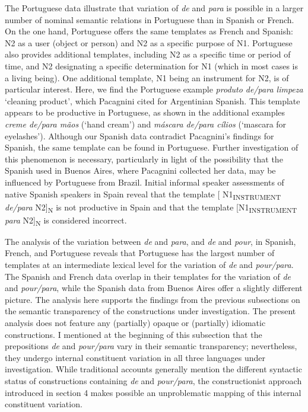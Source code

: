 \documentclass[output=paper]{langsci/langscibook}
\begin{document}
The Portuguese data illustrate that variation of \textit{de} and \textit{para} is possible in a larger number of nominal semantic relations in Portuguese than in Spanish or French. On the one hand, Portuguese offers the same templates as French and Spanish: N2 as a user (object or person) and N2 as a specific purpose of N1. Portuguese also provides additional templates, including N2 as a specific time or period of time, and N2 designating a specific determination for N1 (which in most cases is a living being). One additional template, N1 being an instrument for N2, is of particular interest. Here, we find the Portuguese example \textit{produto de/para limpeza} `cleaning product', which Pacagnini cited for Argentinian Spanish. This template appears to be productive in Portuguese, as shown in the additional examples \textit{creme de/para mãos} (`hand cream') and \textit{máscara de\slash para cílios} (`mascara for eyelashes'). Although our Spanish data contradict Pacagnini's findings for Spanish, the same template can be found in Portuguese. Further investigation of this phenomenon is necessary, particularly in light of the possibility that the Spanish used in Buenos Aires, where Pacagnini collected her data, may be influenced by Portuguese from Brazil. Initial informal speaker assessments of native Spanish speakers in Spain reveal that the template [ N1\textsubscript{INSTRUMENT} \textit{de/para} N2]\textsubscript{N} is not productive in Spain and that the template [N1\textsubscript{INSTRUMENT} \textit{para} N2]\textsubscript{N} is considered incorrect. 

The analysis of the variation between \textit{de} and \textit{para}, and \textit{de} and \textit{pour}, in Spanish, French, and Portuguese reveals that Portuguese has the largest number of templates at an intermediate lexical level for the variation of \textit{de} and \textit{pour/para}. The Spanish and French data overlap in their templates for the variation of \textit{de} and \textit{pour/para}, while the Spanish data from Buenos Aires \citep{Pacagnini:2003} offer a slightly different picture. The analysis here supports the findings from the previous subsections on the semantic transparency of the constructions under investigation. The present analysis does not feature any (partially) opaque or (partially) idiomatic constructions.
I mentioned at the beginning of this subsection that the prepositions \textit{de} and \textit{pour/para} vary in their semantic transparency; nevertheless, they undergo internal constituent variation in all three languages under investigation. While traditional accounts generally mention the different syntactic status of constructions containing \textit{de} and \textit{pour/para}, the constructionist approach introduced in section 4 makes possible an unproblematic mapping of this internal constituent variation.  
\end{document}
